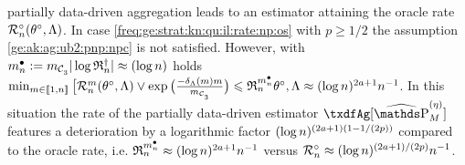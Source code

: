 \begin{il}
  partially data-driven aggregation leads to an estimator attaining
  the oracle rate $\oRa{\xdf,\Lambda}$. In case \ref{freq:ge:strat:kn:qu:il:rate:np:os}
  with $p\geq1/2$ the assumption \ref{ge:ak:ag:ub2:pnp:npc} is not
  satisfied. However, with
  $\sDi{\ssY}:=\Di_{\cst{3}} \vert \log\naRaS{\xdf,\Lambda} \vert \approx(\log\ssY)$ holds
  $\min_{\Di\in\nset{1,\ssY}}\big[\dRa{\Di}{\xdf,\Lambda}\vee\exp\big(\tfrac{-\cmiSv\Di}{\Di_{\cst{3}}}\big)\leq\daRa{\sDi{\ssY}}{\xdf,\Lambda}\approx(\log\ssY)^{2a+1}\ssY^{-1}$.
  In this situation the rate of the partially data-driven estimator
  $\txdfAg[{\erWe[]}]$ features a deterioration by a logarithmic factor
  $(\log\ssY)^{(2a+1)(1-1/(2p))}$ compared to the oracle rate, i.e.
  $\daRaS{\sDi{\ssY}}{\xdf,\Lambda}\approx(\log\ssY)^{2a+1}\ssY^{-1}$ versus
  $\oRaS{\xdf,\Lambda}\approx(\log\ssY)^{(2a+1)/(2p)}\ssY^{-1}$.\ilEnd
\end{il}

